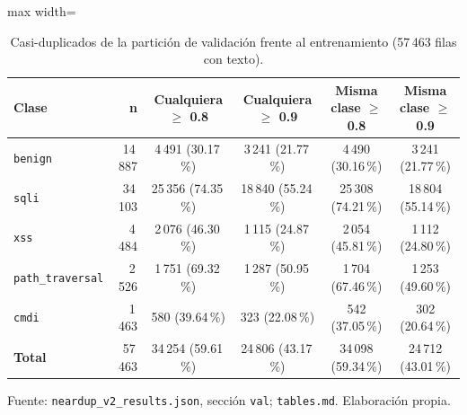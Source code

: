 \begin{table}[htbp]
\centering
\footnotesize
\setlength{\tabcolsep}{3pt}
\begin{adjustbox}{max width=\linewidth}
\begin{tabular}{|l|r|c|c|c|c|}
\hline
\textbf{Clase} & \textbf{n} & \textbf{Cualquiera $\geq$ 0.8} & \textbf{Cualquiera $\geq$ 0.9} & \textbf{Misma clase $\geq$ 0.8} & \textbf{Misma clase $\geq$ 0.9} \\ \hline
\texttt{benign} & 14\,887 & 4\,491 (30.17\,\%) & 3\,241 (21.77\,\%) & 4\,490 (30.16\,\%) & 3\,241 (21.77\,\%) \\ \hline
\texttt{sqli} & 34\,103 & 25\,356 (74.35\,\%) & 18\,840 (55.24\,\%) & 25\,308 (74.21\,\%) & 18\,804 (55.14\,\%) \\ \hline
\texttt{xss} & 4\,484 & 2\,076 (46.30\,\%) & 1\,115 (24.87\,\%) & 2\,054 (45.81\,\%) & 1\,112 (24.80\,\%) \\ \hline
\texttt{path\_traversal} & 2\,526 & 1\,751 (69.32\,\%) & 1\,287 (50.95\,\%) & 1\,704 (67.46\,\%) & 1\,253 (49.60\,\%) \\ \hline
\texttt{cmdi} & 1\,463 & 580 (39.64\,\%) & 323 (22.08\,\%) & 542 (37.05\,\%) & 302 (20.64\,\%) \\ \hline
\textbf{Total} & 57\,463 & 34\,254 (59.61\,\%) & 24\,806 (43.17\,\%) & 34\,098 (59.34\,\%) & 24\,712 (43.01\,\%) \\ \hline
\end{tabular}
\end{adjustbox}
\caption{Casi-duplicados de la partición de validación frente al entrenamiento (57\,463 filas con texto).}
\label{tabla:anexo-casi-val}
\par\smallskip\footnotesize Fuente: \texttt{neardup\_v2\_results.json}, sección \texttt{val}; \texttt{tables.md}. Elaboración propia.
\end{table}


